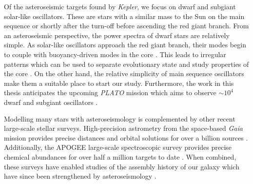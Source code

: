 
Of the asteroseismic targets found by \emph{Kepler}, we focus on dwarf and subgiant solar-like oscillators. These are stars with a similar mass to the Sun on the main sequence or shortly after the turn-off before ascending the red giant branch. From an asteroseismic perspective, the power spectra of dwarf stars are relatively simple. As solar-like oscillators approach the red giant branch, their modes begin to couple with buoyancy-driven modes in the core \citep{Bedding.Mosser.ea2011,Mosser.Barban.ea2011}. This leads to irregular patterns which can be used to separate evolutionary state and study properties of the core \citep[e.g.][]{Mosser.Vrard.ea2015}. On the other hand, the relative simplicity of main sequence oscillators make them a suitable place to start our study. Furthermore, the work in this thesis anticipates the upcoming \emph{PLATO} mission which aims to observe \(\sim 10^4\) dwarf and subgiant oscillators \citep{Rauer.Aerts.ea2016}.


Modelling many stars with asteroseismology is complemented by other recent large-scale stellar surveys. High-precision astrometry from the space-based \emph{Gaia} mission provides precise distances and orbital solutions for over a billion sources \citep{GaiaCollaboration.Prusti.ea2016}. Additionally, the APOGEE large-scale spectroscopic survey provides precise chemical abundances for over half a million targets to date \citep{Majewski.Schiavon.ea2017,Jonsson.Holtzman.ea2020}. When combined, these surveys have enabled studies of the assembly history of our galaxy \citep[e.g.][]{Helmi.Babusiaux.ea2018} which have since been strengthened by asteroseismology \citep{Chaplin.Serenelli.ea2020,Montalban.Mackereth.ea2021}.

